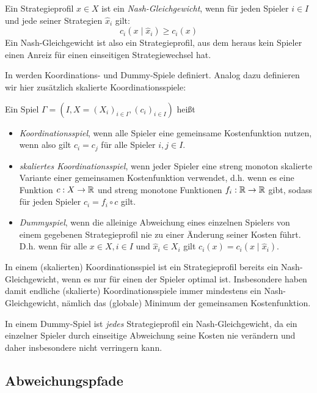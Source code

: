 \begin{defn}
	Ein Strategieprofil $x \in X$ ist ein \emph{Nash-Gleichgewicht}, wenn für jeden Spieler $i \in I$ und jede seiner Strategien $\hat{x}_i$ gilt:
		\[c_i(x \mid \hat{x}_i) \geq c_i(x)\]
	Ein Nash-Gleichgewicht ist also ein Strategieprofil, aus dem heraus kein Spieler einen Anreiz für einen einseitigen Strategiewechsel hat.	
\end{defn}

In \cite[Definition 2.2]{KoordDummy} werden Koordinations- und Dummy-Spiele definiert. Analog dazu definieren wir hier zusätzlich skalierte Koordinationsspiele:
\begin{defn}
	Ein Spiel $\Gamma = (I, X = (X_i)_{i \in I}, (c_i)_{i\in I})$ heißt
	\begin{itemize}
		\item \emph{Koordinationsspiel}, wenn alle Spieler eine gemeinsame Kostenfunktion nutzen, wenn also gilt $c_i = c_j$ für alle Spieler $i,j \in I$.
		\item \emph{skaliertes Koordinationsspiel}, wenn jeder Spieler eine streng monoton skalierte Variante einer gemeinsamen Kostenfunktion verwendet, d.h. wenn es eine Funktion $c: X \to \mathbb{R}$ und streng monotone Funktionen $f_i: \mathbb{R} \to \mathbb{R}$ gibt, sodass für jeden Spieler $c_i = f_i \circ c$ gilt.
		\item \emph{Dummyspiel}, wenn die alleinige Abweichung eines einzelnen Spielers von einem gegebenen Strategieprofil nie zu einer Änderung seiner Kosten führt. D.h. wenn für alle $x \in X, i \in I$ und $\hat{x}_i \in X_i$ gilt $c_i(x) = c_i(x \mid \hat{x}_i)$.
	\end{itemize}
\end{defn}

\begin{beob}
	In einem (skalierten) Koordinationsspiel ist ein Strategieprofil bereits ein Nash-Gleichgewicht, wenn es nur für einen der Spieler optimal ist. Insbesondere haben damit endliche (skalierte) Koordinationsspiele immer mindestens ein Nash-Gleichgewicht, nämlich das (globale) Minimum der gemeinsamen Kostenfunktion.
	
	In einem Dummy-Spiel ist \emph{jedes} Strategieprofil ein Nash-Gleichgewicht, da ein einzelner Spieler durch einseitige Abweichung seine Kosten nie verändern und daher insbesondere nicht verringern kann.
\end{beob}


\subsection{Abweichungspfade}


